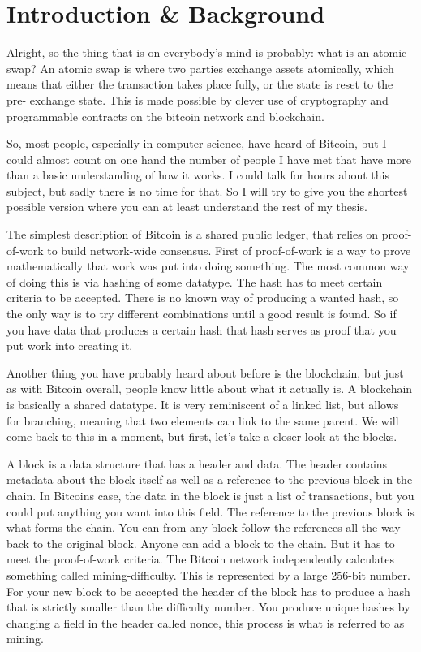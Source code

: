 \chapter{Introduction \& Background}
Alright, so the thing that is on everybody's mind is probably: what is an atomic 
swap? An atomic swap is where two parties exchange assets atomically, which means
that either the transaction takes place fully, or the state is reset to the pre-
exchange state. This is made possible by clever use of cryptography and 
programmable contracts on the bitcoin network and blockchain. 

So, most people, especially in computer science, have heard of Bitcoin, but I could 
almost count on one hand the number of people I have met that have more than 
a basic understanding of how it works. I could talk for hours about this 
subject, but sadly there is no time for that. So I will try to give you the 
shortest possible version where you can at least understand the rest of my
thesis.

The simplest description of Bitcoin is a shared public ledger, that relies 
on proof-of-work to build network-wide consensus. First of proof-of-work
is a way to prove mathematically that work was put into doing something. 
The most common way of doing this is via hashing of some datatype.
The hash has to meet certain criteria to be accepted. There is no known 
way of producing a wanted hash, so the only way is to try different combinations
until a good result is found. So if you have data that produces a certain hash
that hash serves as proof that you put work into creating it.

Another thing you have probably heard about before is the blockchain, but
just as with Bitcoin overall, people know little about what it actually is. 
A blockchain is basically a shared datatype. It is very reminiscent of a
linked list, but allows for branching, meaning that two elements can link 
to the same parent. We will come back to this in a moment, but first, let's 
take a closer look at the blocks.

A block is a data structure that has a header and data. The header contains 
metadata about the block itself as well as a reference to the previous block
in the chain. In Bitcoins case, the data in the block is just a list of transactions,
but you could put anything you want into this field. The reference to the previous
block is what forms the chain. You can from any block follow the references 
all the way back to the original block. Anyone can add a block to the chain. But 
it has to meet the proof-of-work criteria. The Bitcoin network independently calculates 
something called mining-difficulty. This is represented by a large 256-bit number. 
For your new block to be accepted the header of the block has to produce a hash that
is strictly smaller than the difficulty number. You produce unique hashes by changing 
a field in the header called nonce, this process is what is referred to as mining. 

